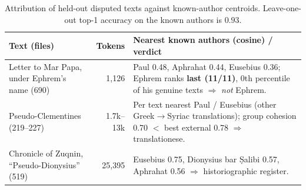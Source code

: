 \begin{table}[t]
  \centering
  \small
  \begin{tabular}{p{2.9cm}rp{6.6cm}}
    \toprule
    \textbf{Text (files)} & \textbf{Tokens} & \textbf{Nearest known authors (cosine) / verdict} \\
    \midrule
    Letter to Mar Papa, under Ephrem's name (690)
      & 1{,}126
      & Paul 0.48, Aphrahat 0.44, Eusebius 0.36; Ephrem ranks \textbf{last (11/11)},
        0th percentile of his genuine texts $\Rightarrow$ \emph{not} Ephrem. \\
    \addlinespace
    Pseudo-Clementines (219--227)
      & 1.7k--13k
      & Per text nearest Paul / Eusebius (other Greek$\to$Syriac translations);
        group cohesion 0.70 $<$ best external 0.78 $\Rightarrow$ translationese. \\
    \addlinespace
    Chronicle of Zuqnin, ``Pseudo-Dionysius'' (519)
      & 25{,}395
      & Eusebius 0.75, Dionysius bar \d{S}alibi 0.57, Aphrahat 0.56 $\Rightarrow$
        historiographic register. \\
    \bottomrule
  \end{tabular}
  \caption{Attribution of held-out disputed texts against known-author centroids.
  Leave-one-out top-1 accuracy on the known authors is $0.93$.}
  \label{tab:disputed}
\end{table}
